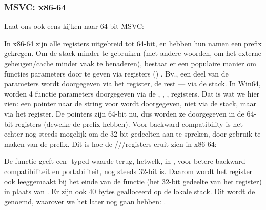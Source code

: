 \subsubsection{MSVC: x86-64}

Laat ons ook eens kijken naar 64-bit MSVC:




In x86-64 zijn alle registers uitgebreid tot 64-bit, en hebben hun namen een  prefix gekregen.
Om de stack minder te gebruiken (met andere woorden, om het externe geheugen/cache minder vaak te benaderen), bestaat
er een populaire manier om functies parameters door te geven via registers () .
Bv., een deel van de parameters wordt doorgegeven via het register, de rest --- via de stack.
In Win64, worden 4 functie parameters doorgegeven via de \RCX, \RDX, ,  registers.
Dat is wat we hier zien: een pointer naar de string voor \printf wordt doorgegeven, niet via de stack, maar via het \RCX register.
De pointers zijn 64-bit nu, dus worden ze doorgegeven in de 64-bit registers (dewelke de  prefix hebben).
Voor backward compatibility is het echter nog steeds mogelijk om de 32-bit gedeelten aan te spreken, door gebruik te maken van de  prefix.
Dit is hoe de \RAX/\EAX/\AX/\AL registers eruit zien in x86-64:


De \main functie geeft een \Tint{}-typed waarde terug, hetwelk, in \CCpp, voor betere backward compatibiliteit
en portabiliteit, nog steeds 32-bit is. Daarom wordt het \EAX register ook leeggemaakt bij het einde van de functie
(het 32-bit gedeelte van het register) in plaats van \RAX{}.
Er zijn ook 40 bytes gealloceerd op de lokale stack.
Dit wordt de  genoemd, waarover we het later nog gaan hebben: .

